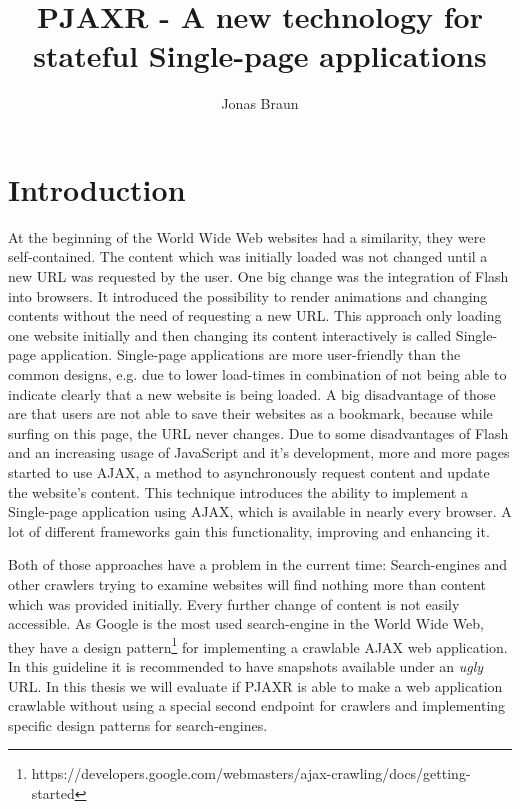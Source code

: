 \documentclass[f,bachelor,binding,twoside,palatino]{WeSTthesis}
\author{Jonas Braun}
\title{PJAXR - A new technology for stateful Single-page applications}
\begin{document}

\maketitle %

\tableofcontents

\varclearpage



\addtocounter{footnote}

\section{Introduction}
    At the beginning of the World Wide Web websites had a similarity, they were self-contained. The content which was initially loaded was not changed until a new URL was requested by the user.
    One big change was the integration of Flash into browsers. It introduced the possibility to render animations and changing contents without the need of requesting a new URL.
    This approach only loading one website initially and then changing its content interactively is called Single-page application.
    Single-page applications are more user-friendly than the common designs, e.g. due to lower load-times in combination of not being able to indicate clearly that a new website is being loaded.
    A big disadvantage of those are that users are not able to save their websites as a bookmark, because while surfing on this page, the URL never changes.
    Due to some disadvantages of Flash and an increasing usage of JavaScript and it's development, more and more pages started to use AJAX, a method to asynchronously request content and update the website's content. This technique introduces the ability to implement a Single-page application using AJAX, which is available in nearly every browser. A lot of different frameworks gain this functionality, improving and enhancing it.

    Both of those approaches have a problem in the current time: Search-engines and other crawlers trying to examine websites will find nothing more than content which was provided initially. Every further change of content is not easily accessible.
    As Google is the most used search-engine in the World Wide Web, they have a design pattern\footnote{https://developers.google.com/webmasters/ajax-crawling/docs/getting-started} for implementing a crawlable AJAX web application. In this guideline it is recommended to have snapshots available under an \emph{ugly} URL.
    In this thesis we will evaluate if PJAXR is able to make a web application crawlable without using a special second endpoint for crawlers and implementing specific design patterns for search-engines.
\end{document}
